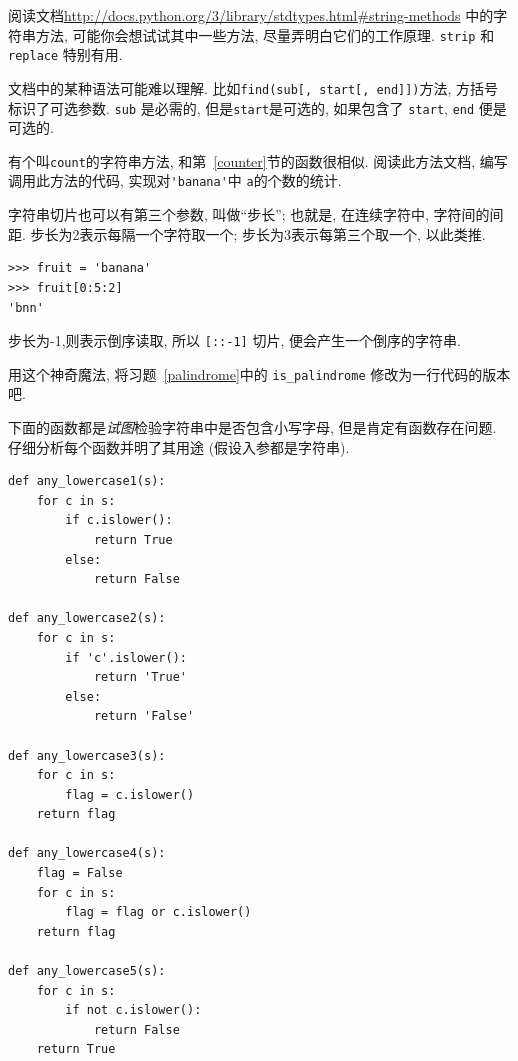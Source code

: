 \documentclass[10pt]{book}
\begin{document}
\begin{exercise}

阅读文档\url{http://docs.python.org/3/library/stdtypes.html#string-methods}
中的字符串方法, 
可能你会想试试其中一些方法, 尽量弄明白它们的工作原理. 
{\tt strip} 和 {\tt replace} 特别有用. 

文档中的某种语法可能难以理解. 
比如\verb"find(sub[, start[, end]])"方法, 方括号标识了可选参数. 
 {\tt sub} 是必需的, 但是{\tt start}是可选的, 
如果包含了 {\tt start}, {\tt end} 便是可选的. 

\end{exercise}


\begin{exercise}

有个叫{\tt count}的字符串方法, 和第~\ref{counter}节的函数很相似. 
阅读此方法文档, 编写调用此方法的代码, 实现对\verb"'banana'"中
{\tt a}的个数的统计.
\end{exercise}


\begin{exercise}

字符串切片也可以有第三个参数, 叫做``步长'';
也就是, 在连续字符中, 字符间的间距. 
步长为2表示每隔一个字符取一个;
步长为3表示每第三个取一个, 以此类推. 

\begin{verbatim}
>>> fruit = 'banana'
>>> fruit[0:5:2]
'bnn'
\end{verbatim}
步长为-1,则表示倒序读取, 所以 \verb"[::-1]" 切片, 
便会产生一个倒序的字符串. 

用这个神奇魔法, 将习题~\ref{palindrome}中的 \verb"is_palindrome"
修改为一行代码的版本吧. 
\end{exercise}


\begin{exercise}

下面的函数都是{\em 试图}检验字符串中是否包含小写字母, 
但是肯定有函数存在问题. 
仔细分析每个函数并明了其用途
(假设入参都是字符串).

\begin{verbatim}
def any_lowercase1(s):
    for c in s:
        if c.islower():
            return True
        else:
            return False

def any_lowercase2(s):
    for c in s:
        if 'c'.islower():
            return 'True'
        else:
            return 'False'

def any_lowercase3(s):
    for c in s:
        flag = c.islower()
    return flag

def any_lowercase4(s):
    flag = False
    for c in s:
        flag = flag or c.islower()
    return flag

def any_lowercase5(s):
    for c in s:
        if not c.islower():
            return False
    return True
\end{verbatim}

\end{exercise}
\end{document}
